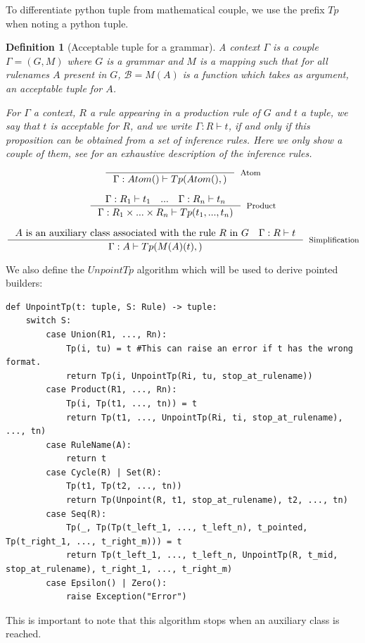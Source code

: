 \documentclass{article}
\newtheorem{definition}{Definition}
\begin{document}
To differentiate python tuple from mathematical couple, we use the prefix $Tp$ when noting a python tuple.

\begin{definition}[Acceptable tuple for a grammar]
A context $\Gamma$ is a couple $\Gamma = (G, M)$ where $G$ is a grammar and $M$ is a mapping such that for all rulenames $A$ present in $G$, $\mathcal{B} = M(A)$ is a function which takes as argument, an acceptable tuple for $A$.

For $\Gamma$ a context, $R$ a rule appearing in a production rule of $G$ and $t$ a tuple, we say that $t$ is acceptable for $R$, and we write $\Gamma: R\vdash t$, if and only if this proposition can be obtained from a set of inference rules. Here we only show a couple of them, see \cite{LAPIN} for an exhaustive description of the inference rules.
$$\inference{}{\Gamma: Atom() \vdash Tp(Atom(),)}[Atom]$$

$$\inference{\Gamma: R_1 \vdash t_1\quad ... \quad \Gamma:R_n\vdash t_n}{\Gamma: R_1 \times ... \times R_n \vdash Tp(t_1, ..., t_n)}[Product]$$

$$\inference{\text{$A$ is an auxiliary class associated with the rule $R$ in $G$} \quad \Gamma: R \vdash t}{\Gamma: A \vdash Tp(M(A)(t),)}[Simplification]$$
\end{definition}

We also define the $UnpointTp$ algorithm which will be used to derive pointed builders:
\begin{lstlisting}
def UnpointTp(t: tuple, S: Rule) -> tuple:
    switch S:
        case Union(R1, ..., Rn):
            Tp(i, tu) = t #This can raise an error if t has the wrong format.
            return Tp(i, UnpointTp(Ri, tu, stop_at_rulename))
        case Product(R1, ..., Rn):
            Tp(i, Tp(t1, ..., tn)) = t
            return Tp(t1, ..., UnpointTp(Ri, ti, stop_at_rulename), ..., tn)
        case RuleName(A):
            return t
        case Cycle(R) | Set(R):
            Tp(t1, Tp(t2, ..., tn))
            return Tp(Unpoint(R, t1, stop_at_rulename), t2, ..., tn)
        case Seq(R):
            Tp(_, Tp(Tp(t_left_1, ..., t_left_n), t_pointed, Tp(t_right_1, ..., t_right_m))) = t
            return Tp(t_left_1, ..., t_left_n, UnpointTp(R, t_mid, stop_at_rulename), t_right_1, ..., t_right_m)
        case Epsilon() | Zero():
            raise Exception("Error")
\end{lstlisting}

This is important to note that this algorithm stops when an auxiliary class is reached.
\end{document}
